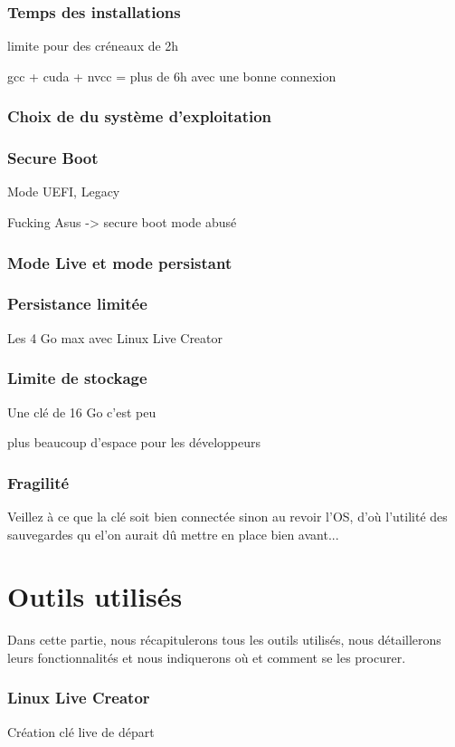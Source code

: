 \documentclass[final]{polytech/polytech}
\begin{document}
\section{Temps des installations}
limite pour des créneaux de 2h

gcc + cuda + nvcc = plus de 6h avec une bonne connexion

\section{Choix de du système d'exploitation}

\section{Secure Boot}
Mode UEFI, Legacy

Fucking Asus -> secure boot mode abusé

\section{Mode Live et mode persistant}

\section{Persistance limitée}
Les 4 Go max avec Linux Live Creator

\section{Limite de stockage}
Une clé de 16 Go c'est peu

plus beaucoup d'espace pour les développeurs

\section{Fragilité}
Veillez à ce que la clé soit bien connectée sinon au revoir l'OS, d'où l'utilité des sauvegardes qu el'on aurait dû mettre en place bien avant...

\part{Outils utilisés}
Dans cette partie, nous récapitulerons tous les outils utilisés, nous détaillerons leurs fonctionnalités et nous indiquerons où et comment se les procurer.

\section{Linux Live Creator}
Création clé live de départ
\end{document}

